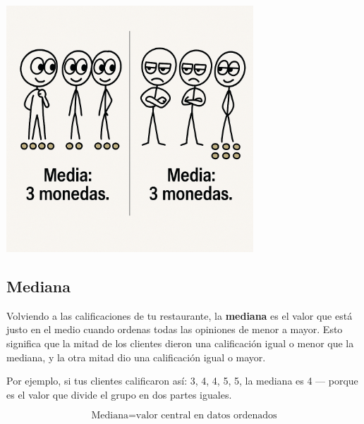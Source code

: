 \documentclass[
  spanish,
  letterpaper,
  DIV=11,
  numbers=noendperiod]{scrreprt}
\begin{document}
\begin{center}
\includegraphics[width=3.64583in,height=\textheight,keepaspectratio]{img/media_3.png}
\end{center}

\subsection{Mediana}\label{mediana}

Volviendo a las calificaciones de tu restaurante, la \textbf{mediana} es
el valor que está justo en el medio cuando ordenas todas las opiniones
de menor a mayor. Esto significa que la mitad de los clientes dieron una
calificación igual o menor que la mediana, y la otra mitad dio una
calificación igual o mayor.

Por ejemplo, si tus clientes calificaron así: 3, 4, 4, 5, 5, la mediana
es 4 --- porque es el valor que divide el grupo en dos partes iguales.

\begin{tcolorbox}[enhanced jigsaw, colback=white, bottomrule=.15mm, opacityback=0, breakable, rightrule=.15mm, arc=.35mm, left=2mm, toprule=.15mm, colframe=quarto-callout-tip-color-frame, leftrule=.75mm]
\begin{minipage}[t]{5.5mm}
\textcolor{quarto-callout-tip-color}{\faLightbulb}
\end{minipage}%
\begin{minipage}[t]{\textwidth - 5.5mm}

\[
\text{Mediana} = \text{valor central en datos ordenados}
\]

\end{minipage}%
\end{tcolorbox}
\end{document}
